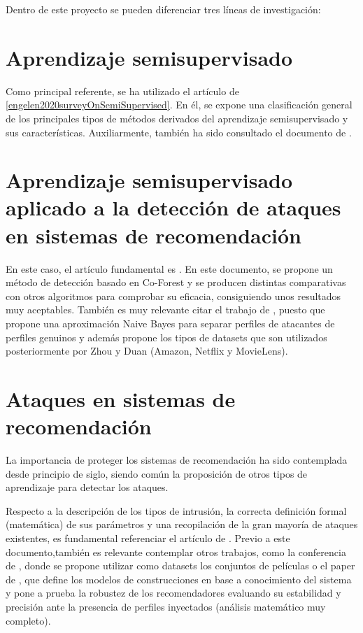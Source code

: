 
Dentro de este proyecto se pueden diferenciar tres líneas de investigación:


\section{Aprendizaje semisupervisado}


Como principal referente, se ha utilizado el artículo de \ref{engelen2020surveyOnSemiSupervised}. En él, se expone una clasificación general de los principales tipos de métodos derivados del aprendizaje semisupervisado y sus características. Auxiliarmente, también ha sido consultado el documento de \cite{triguero2015SelflabeledTechniques}. 


\section{Aprendizaje semisupervisado aplicado a la detección de ataques en sistemas de recomendación}

En este caso, el artículo fundamental es \cite{zhou2021SemisupervisedRecommendationAttack}. En este documento, se propone un método de detección basado en Co-Forest y se producen distintas comparativas con otros algoritmos para comprobar su eficacia, consiguiendo unos resultados muy aceptables. También es muy relevante citar el trabajo de \cite{zhiang2012HySADNayveBayes}, puesto que propone una aproximación Naive Bayes para separar perfiles de atacantes de perfiles genuinos y además propone los tipos de datasets que son utilizados posteriormente por Zhou y Duan (Amazon, Netflix y MovieLens).

\section{Ataques en sistemas de recomendación}

La importancia de proteger los sistemas de recomendación ha sido contemplada desde principio de siglo, siendo común la proposición de otros tipos de aprendizaje para detectar los ataques.

Respecto a la descripción de los tipos de intrusión, la correcta definición formal (matemática) de sus parámetros y una recopilación de la gran mayoría de ataques existentes, es fundamental referenciar el artículo de \cite{mingdan2020ShillingAttacksAReview}. Previo a este documento,también es relevante contemplar otros trabajos, como la conferencia de \cite{lam2004ShillingRecommender}, donde se propone utilizar como datasets los conjuntos de películas o el paper de \cite{mahony2004CollaborativeRecommendation}, que define los modelos de construcciones en base a conocimiento del sistema y pone a prueba la robustez de los recomendadores evaluando su estabilidad y precisión ante la presencia de perfiles inyectados (análisis matemático muy completo).